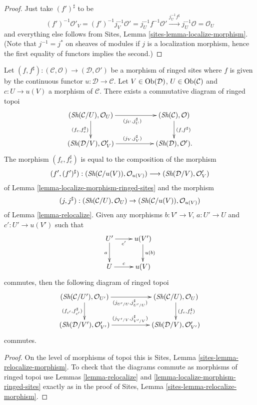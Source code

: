 \begin{proof}
Just take $(f')^\sharp$ to be
$$
(f')^{-1}\mathcal{O}'_V =
(f')^{-1}j_V^{-1}\mathcal{O}' =
j_U^{-1}f^{-1}\mathcal{O}' \xrightarrow{j_U^{-1}f^\sharp}
j_U^{-1}\mathcal{O} = \mathcal{O}_U
$$
and everything else follows from
Sites, Lemma \ref{sites-lemma-localize-morphism}.
(Note that $j^{-1} = j^*$ on sheaves of modules if $j$ is a localization
morphism, hence the first equality of functors implies the second.)
\end{proof}

\begin{lemma}
\label{lemma-relocalize-morphism-ringed-sites}
Let
$(f, f^\sharp) :
(\mathcal{C}, \mathcal{O})
\longrightarrow
(\mathcal{D}, \mathcal{O}')$
be a morphism of ringed sites where $f$ is given by the continuous
functor $u : \mathcal{D} \to \mathcal{C}$.
Let $V \in \mathop{\rm Ob}\nolimits(\mathcal{D})$, $U \in \mathop{\rm Ob}\nolimits(\mathcal{C})$
and $c : U \to u(V)$ a morphism of $\mathcal{C}$.
There exists a commutative diagram of ringed topoi
$$
\xymatrix{
(\Sh(\mathcal{C}/U), \mathcal{O}_U)
\ar[rr]_{(j_U, j_U^\sharp)} \ar[d]_{(f_c, f_c^\sharp)} & &
(\Sh(\mathcal{C}), \mathcal{O}) \ar[d]^{(f, f^\sharp)} \\
(\Sh(\mathcal{D}/V), \mathcal{O}'_V)
\ar[rr]^{(j_V, j_V^\sharp)} & &
(\Sh(\mathcal{D}), \mathcal{O}').
}
$$
The morphism $(f_c, f_c^\sharp)$
is equal to the composition of the morphism
$$
(f', (f')^\sharp) :
(\mathop{\textit{Sh}}\nolimits(\mathcal{C}/u(V)), \mathcal{O}_{u(V)})
\longrightarrow
(\mathop{\textit{Sh}}\nolimits(\mathcal{D}/V), \mathcal{O}'_V)
$$
of
Lemma \ref{lemma-localize-morphism-ringed-sites}
and the morphism
$$
(j, j^\sharp) :
(\mathop{\textit{Sh}}\nolimits(\mathcal{C}/U), \mathcal{O}_U)
\to
(\mathop{\textit{Sh}}\nolimits(\mathcal{C}/u(V)), \mathcal{O}_{u(V)})
$$
of
Lemma \ref{lemma-relocalize}.
Given any morphisms $b : V' \to V$, $a : U' \to U$ and
$c' : U' \to u(V')$ such that
$$
\xymatrix{
U' \ar[r]_-{c'} \ar[d]_a & u(V') \ar[d]^{u(b)} \\
U \ar[r]^-c & u(V)
}
$$
commutes, then the following diagram of ringed topoi
$$
\xymatrix{
(\Sh(\mathcal{C}/U'), \mathcal{O}_{U'})
\ar[rr]_{(j_{U'/U}, j_{U'/U}^\sharp)} \ar[d]_{(f_{c'}, f_{c'}^\sharp)} & &
(\Sh(\mathcal{C}/U), \mathcal{O}_U)
\ar[d]^{(f_c, f_c^\sharp)} \\
(\Sh(\mathcal{D}/V'), \mathcal{O}'_{V'})
\ar[rr]^{(j_{V'/V}, j_{V'/V}^\sharp)} & &
(\Sh(\mathcal{D}/V), \mathcal{O}'_{V'})
}
$$
commutes.
\end{lemma}

\begin{proof}
On the level of morphisms of topoi this is
Sites, Lemma \ref{sites-lemma-relocalize-morphism}.
To check that the diagrams commute as morphisms of ringed topoi use
Lemmas \ref{lemma-relocalize} and
\ref{lemma-localize-morphism-ringed-sites}
exactly as in the proof of
Sites, Lemma \ref{sites-lemma-relocalize-morphism}.
\end{proof}
















